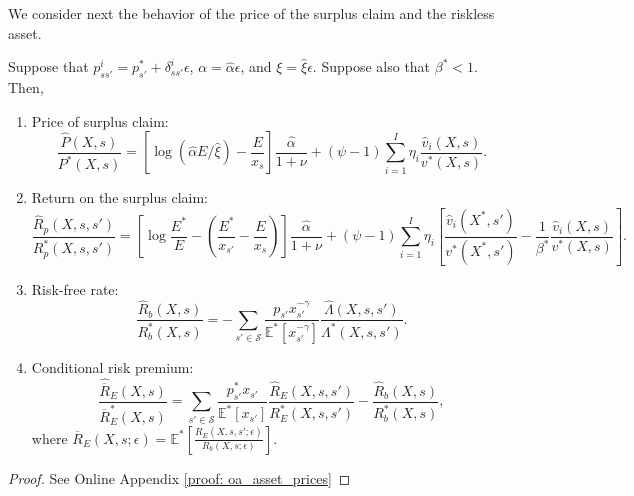 We consider next the behavior of the price of the surplus claim and the riskless asset.
\begin{proposition}\label{oa_asset_prices} Suppose that $p_{ss'}^i = p_{s'}^* + \delta_{ss'}^i \epsilon$, $\alpha = \hat{\alpha} \epsilon$, and $\xi = \hat{\xi} \epsilon$. Suppose also that $\beta^* < 1$. Then,
\begin{enumerate}
    \item Price of surplus claim:
    \begin{equation}
        \frac{\hat{P}(X,s)}{P^*(X,s)}  = \left[\log (\hat{\alpha} E / \hat{\xi}) -  \frac{E}{x_s}\right] \frac{\hat{\alpha}}{1+\nu} + (\psi-1) \sum_{i=1}^I \eta_i \frac{\hat{v}_i(X,s)}{v^*(X,s)}.
    \end{equation}
    \item Return on the surplus claim:
    \begin{equation}
    \frac{\hat{R}_{p}(X,s,s')}{R_p^*(X,s,s')} = 
    \left[ \log \frac{E^*}{E} - \left( \frac{E^*}{x_{s'}} - \frac{E}{x_s} \right) \right]\frac{\hat{\alpha}}{1+\nu} + (\psi-1) \sum_{i=1}^I \eta_i \left[ \frac{\hat{v}_i(X^*,s')}{v^*(X^*,s')}- \frac{1}{\beta^*} \frac{\hat{v}_i(X,s)}{v^*(X,s)}\right].
\end{equation}
\item Risk-free rate:
    \begin{equation}
        \frac{\hat{R}_b(X,s)}{R_b^*(X,s)} = - \sum_{s'\in\mathcal{S}} \frac{p_{s'} x_{s'}^{-\gamma}}{\mathbb{E}^*[x_{s'}^{-\gamma}]} \frac{\hat{\Lambda}(X,s,s')}{\Lambda^*(X,s,s')}.
    \end{equation}
\item Conditional risk premium:
\begin{equation}
    \frac{\widehat{\overline{R}}_E(X,s)}{\overline{R}_E^*(X,s)} = \sum_{s'\in \mathcal{S}} \frac{p_{s'}^* x_{s'}}{\mathbb{E}^*[x_{s'}]} \frac{\hat{R}_E(X,s,s')}{R_E^*(X,s,s')} -\frac{\hat{R}_b(X,s)}{R^*_b(X,s)},
\end{equation}
where $\overline{R}_E(X,s;\epsilon) = \mathbb{E}^*\left[ \frac{R_E(X,s,s';\epsilon)}{R_b(X,s;\epsilon)}\right] $.
\end{enumerate}
\end{proposition}
\begin{proof}
See Online Appendix \ref{proof: oa_asset_prices}
\end{proof}

